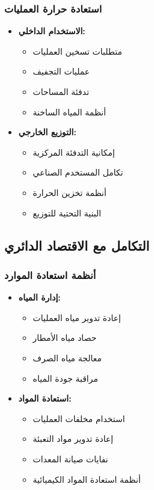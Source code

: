 \subsubsection{استعادة حرارة العمليات}
\begin{itemize}
    \item \textbf{الاستخدام الداخلي:}
    \begin{itemize}
        \item متطلبات تسخين العمليات
        \item عمليات التجفيف
        \item تدفئة المساحات
        \item أنظمة المياه الساخنة
    \end{itemize}
    
    \item \textbf{التوزيع الخارجي:}
    \begin{itemize}
        \item إمكانية التدفئة المركزية
        \item تكامل المستخدم الصناعي
        \item أنظمة تخزين الحرارة
        \item البنية التحتية للتوزيع
    \end{itemize}
\end{itemize}

\subsection{التكامل مع الاقتصاد الدائري}

\subsubsection{أنظمة استعادة الموارد}
\begin{itemize}
    \item \textbf{إدارة المياه:}
    \begin{itemize}
        \item إعادة تدوير مياه العمليات
        \item حصاد مياه الأمطار
        \item معالجة مياه الصرف
        \item مراقبة جودة المياه
    \end{itemize}
    
    \item \textbf{استعادة المواد:}
    \begin{itemize}
        \item استخدام مخلفات العمليات
        \item إعادة تدوير مواد التعبئة
        \item نفايات صيانة المعدات
        \item أنظمة استعادة المواد الكيميائية
    \end{itemize}
\end{itemize}

